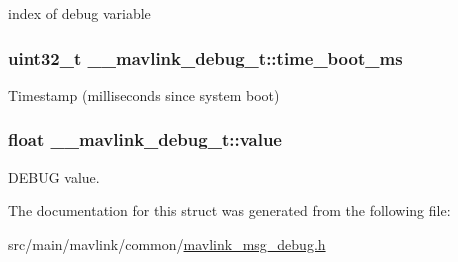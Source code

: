 index of debug variable 

\hypertarget{struct____mavlink__debug__t_afc1d1057d77ded488ac7b5034411604c}{
\subsubsection[{time\+\_\+boot\+\_\+ms}]{\setlength{\rightskip}{0pt plus 5cm}uint32\+\_\+t \+\_\+\+\_\+mavlink\+\_\+debug\+\_\+t\+::time\+\_\+boot\+\_\+ms}}\label{struct____mavlink__debug__t_afc1d1057d77ded488ac7b5034411604c}


Timestamp (milliseconds since system boot) 

\hypertarget{struct____mavlink__debug__t_aef9d0e91db46dff84494856146dcbcbe}{
\subsubsection[{value}]{\setlength{\rightskip}{0pt plus 5cm}float \+\_\+\+\_\+mavlink\+\_\+debug\+\_\+t\+::value}}\label{struct____mavlink__debug__t_aef9d0e91db46dff84494856146dcbcbe}


D\+E\+B\+U\+G value. 



The documentation for this struct was generated from the following file\+:\begin{DoxyCompactItemize}
\item 
src/main/mavlink/common/\hyperlink{mavlink__msg__debug_8h}{mavlink\+\_\+msg\+\_\+debug.\+h}\end{DoxyCompactItemize}
